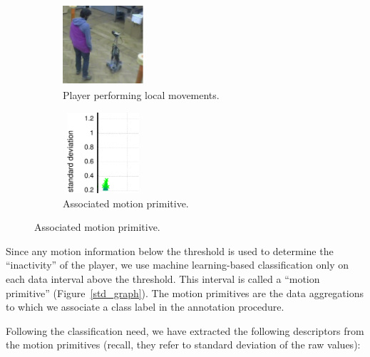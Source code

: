 \begin{figure}[thpb]
  \centering
  \begin{subfigure}[b]{0.3\textwidth}
      \includegraphics[width=3cm,height=3cm]{images/04-activity/enricostill.png}
      \caption{Player performing local movements. }
  \end{subfigure}
  \begin{subfigure}[b]{0.3\textwidth}
      \includegraphics[width=3cm,height=3cm]{images/04-activity/still.png}
      \caption{Associated motion primitive.}
  \end{subfigure}
  \label{localmov}
\end{figure}
    
Since any motion information below the threshold is used to determine the ``inactivity'' of the player, we use machine learning-based classification only on each data interval above the threshold. This interval is called a ``motion primitive'' (Figure~\ref{std_graph}). The motion primitives are the data aggregations to which we associate a class label in the annotation procedure. 

Following the classification need, we have extracted the following descriptors from the motion primitives (recall, they refer to standard deviation of the raw values): 


